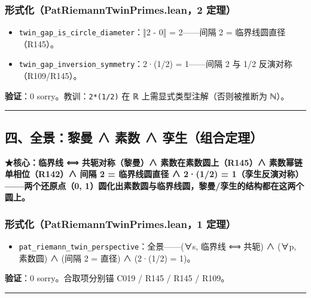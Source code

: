 \documentclass[
]{article}
\providecommand{\tightlist}{%
 \setlength{\itemsep}{0pt}\setlength{\parskip}{0pt}}
\begin{document}
\subsubsection{形式化（PatRiemannTwinPrimes.lean，2
定理）}\label{ux5f62ux5f0fux5316patriemanntwinprimes.lean2-ux5b9aux7406-2}

\begin{itemize}
\tightlist
\item
 \texttt{twin\_gap\_is\_circle\_diameter}：‖2 - 0‖ = 2------间隔 2 =
 临界线圆直径（R145）。
\item
 \texttt{twin\_gap\_inversion\_symmetry}：2·(1/2) = 1------间隔 2 与
 1/2 反演对称（R109/R145）。
\end{itemize}

\textbf{验证}：0 sorry。教训：\texttt{2*(1/2)} 在 ℝ
上需显式类型注解（否则被推断为 ℕ）。

\begin{center}\rule{0.5\linewidth}{0.5pt}\end{center}

\subsection{四、全景：黎曼 ∧ 素数 ∧
孪生（组合定理）}\label{ux56dbux5168ux666fux9eceux66fc-ux7d20ux6570-ux5b6aux751fux7ec4ux5408ux5b9aux7406}

\textbf{★核心：临界线 ⟺ 共轭对称（黎曼）∧ 素数在素数圆上（R145）∧
素数幂链单相位（R142）∧ 间隔 2 = 临界线圆直径 ∧ 2·(1/2) =
1（孪生反演对称）------两个还原点（0,
1）圆化出素数圆与临界线圆，黎曼/孪生的结构都在这两个圆上。}

\subsubsection{形式化（PatRiemannTwinPrimes.lean，1
定理）}\label{ux5f62ux5f0fux5316patriemanntwinprimes.lean1-ux5b9aux7406}

\begin{itemize}
\tightlist
\item
 \texttt{pat\_riemann\_twin\_perspective}：全景------(∀s, 临界线 ⟺
 共轭) ∧ (∀p, 素数圆) ∧ (间隔 2 = 直径) ∧ (2·(1/2) = 1)。
\end{itemize}

\textbf{验证}：0 sorry。合取项分别锚 C019 / R145 / R145 / R109。

\begin{center}\rule{0.5\linewidth}{0.5pt}\end{center}
\end{document}
